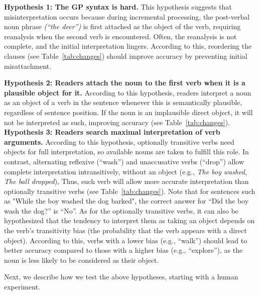 \textbf{Hypothesis 1: The GP syntax is hard.}
    This hypothesis suggests that misinterpretation occurs because during incremental processing, the post-verbal noun phrase \emph{(``the deer'')} is first attached as the object of the verb, requiring reanalysis when the second verb is encountered. Often, the reanalysis is not complete, and the initial interpretation lingers. According to this, reordering the clauses (see Table~\ref{tab:changes}) should improve accuracy by preventing initial misattachment. 


 \textbf{Hypothesis 2: Readers attach the noun to the first verb when it is a plausible object for it. } 
    According to this hypothesis, readers interpret a noun as an object of a verb in the sentence whenever this is semantically plausible, regardless of sentence position. If the noun is an implausible direct object, it will not be interpreted as such, improving accuracy (see Table~\ref{tab:changes}).\textbf{
    Hypothesis 3: Readers search maximal interpretation of verb arguments.} 
    According to this hypothesis, optionally transitive verbs need objects for full interpretation, so available nouns are taken to fulfill this role. In contrast, alternating reflexive (``wash'') and unaccusative verbs (``drop'') allow complete interpretation intransitively, without an object (e.g., \emph{The boy washed}, \textit{The ball dropped}), Thus, such verb will allow more accurate interpretation than optionally transitive verbs (see Table~\ref{tab:changes}).
    Note that for sentences such as "While the boy washed the dog barked", the correct answer for ``Did the boy wash the dog?'' is ``No''. 
    As for the optionally transitive verbs, it can also be hypothesized that the tendency to interpret them as taking an object depends on the verb's transitivity bias (the probability that the verb appears with a direct object). According to this, verbs with a lower bias (e.g., ``walk'') should lead to better accuracy compared to those with a higher bias (e.g., ``explore''), as the noun is less likely to be considered as their object.


Next, we describe how we test the above hypotheses, starting with a human experiment.